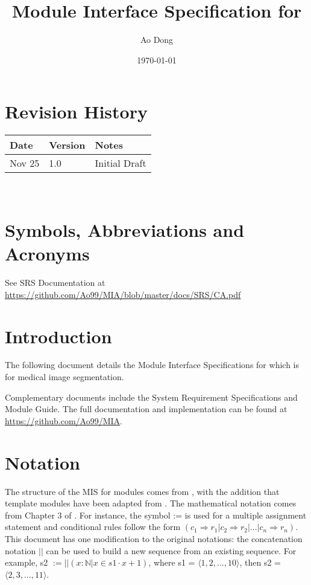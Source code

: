 \documentclass[12pt, titlepage]{article}
\begin{document}
\title{Module Interface Specification for \progname}

\author{Ao Dong}

\date{\today}

\maketitle


\section{Revision History}

\begin{tabularx}{\textwidth}{p{3cm}p{2cm}X}
\toprule {\bf Date} & {\bf Version} & {\bf Notes}\\
\midrule
Nov 25 & 1.0 & Initial Draft\\
\bottomrule
\end{tabularx}

~\newpage

\section{Symbols, Abbreviations and Acronyms}

See SRS Documentation at
\url{https://github.com/Ao99/MIA/blob/master/docs/SRS/CA.pdf}

\newpage

\tableofcontents

\newpage


\section{Introduction}

The following document details the Module Interface Specifications for
\progname{} which is for medical image segmentation.

Complementary documents include the System Requirement Specifications
and Module Guide.  The full documentation and implementation can be
found at \url{https://github.com/Ao99/MIA}.

\section{Notation}

The structure of the MIS for modules comes from \citet{HoffmanAndStrooper1995},
with the addition that template modules have been adapted from
\cite{GhezziEtAl2003}.  The mathematical notation comes from Chapter 3 of
\citet{HoffmanAndStrooper1995}.  For instance, the symbol := is used for a
multiple assignment statement and conditional rules follow the form $(c_1
\Rightarrow r_1 | c_2 \Rightarrow r_2 | ... | c_n \Rightarrow r_n )$. This
document has one modification to the original notations: the concatenation
notation $||$ can be used to build a new sequence from an existing sequence. For
example, s2 $:= ||(x : \mathbb{N} | x \in s1 \cdot x+1)$, where s1 = $\langle
1,2,...,10 \rangle$, then s2 = $\langle 2,3,...,11 \rangle$.
\end{document}
